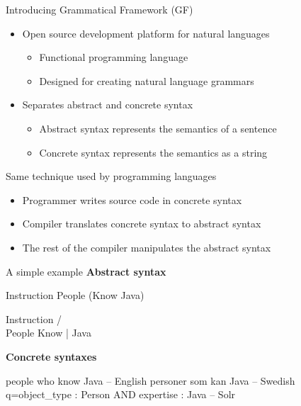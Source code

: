 \begin{frame}{Introducing Grammatical Framework (GF)} 
         \begin{itemize}
           \item Open source development platform for natural languages \pause
           \begin{itemize}
              \item Functional programming language \pause
              \item Designed for creating natural language grammars
           \end{itemize}\pause
           \item Separates abstract and concrete syntax \pause
           \begin{itemize}
              \item Abstract syntax represents the semantics of a sentence \pause
              \item Concrete syntax represents the semantics as a string
           \end{itemize}\pause
         \end{itemize}
         
           \begin{block}{Same technique used by programming languages}
             \begin{itemize}
               \item Programmer writes source code in concrete syntax \pause
               \item Compiler translates concrete syntax to abstract syntax \pause
               \item The rest of the compiler manipulates the abstract syntax
             \end{itemize}
         \end{block}
         
\end{frame}

\begin{frame}[fragile]{A simple example}
\textbf{Abstract syntax}
\begin{semiverbatim}
Instruction People (Know Java)

    Instruction
   /           \\
People        Know
                |
              Java
\end{semiverbatim}\pause


\textbf{Concrete syntaxes}
\begin{semiverbatim}
people who know Java                           -- English
personer som kan Java                          -- Swedish
q=object_type : Person AND expertise : Java    -- Solr
\end{semiverbatim}
\end{frame}

